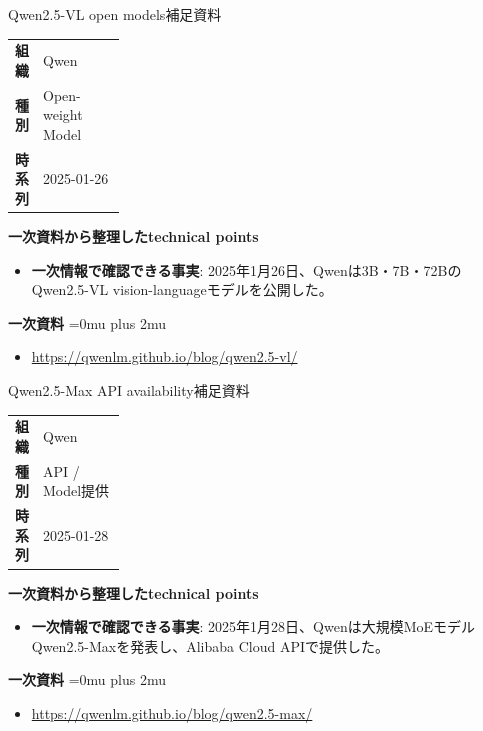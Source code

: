 \begin{technicalnote}{Qwen2.5-VL open models}{補足資料}
\begingroup
\begin{tabularx}{\linewidth}{@{}>{\bfseries}p{0.22\linewidth}X@{}}
組織 & Qwen \\
種別 & Open-weight Model \\
時系列 & 2025-01-26 \\
\end{tabularx}
\smallskip
\begin{minipage}{\linewidth}
{\bfseries 一次資料から整理したtechnical points}
\begin{itemize}[leftmargin=1.5em,itemsep=0.35em]
\item \textbf{一次情報で確認できる事実}: 2025年1月26日、Qwenは3B・7B・72BのQwen2.5-VL vision-languageモデルを公開した。
\end{itemize}
\begin{samepage}
{\bfseries 一次資料}
\begingroup\sloppy
\Urlmuskip=0mu plus 2mu\relax
\begin{itemize}[leftmargin=1.5em,itemsep=0.25em]
\item {\scriptsize\url{https://qwenlm.github.io/blog/qwen2.5-vl/}}
\end{itemize}
\endgroup
\end{samepage}
\end{minipage}
\endgroup
\end{technicalnote}
\medskip

\begin{technicalnote}{Qwen2.5-Max API availability}{補足資料}
\begingroup
\begin{tabularx}{\linewidth}{@{}>{\bfseries}p{0.22\linewidth}X@{}}
組織 & Qwen \\
種別 & API / Model提供 \\
時系列 & 2025-01-28 \\
\end{tabularx}
\smallskip
\begin{minipage}{\linewidth}
{\bfseries 一次資料から整理したtechnical points}
\begin{itemize}[leftmargin=1.5em,itemsep=0.35em]
\item \textbf{一次情報で確認できる事実}: 2025年1月28日、Qwenは大規模MoEモデルQwen2.5-Maxを発表し、Alibaba Cloud APIで提供した。
\end{itemize}
\begin{samepage}
{\bfseries 一次資料}
\begingroup\sloppy
\Urlmuskip=0mu plus 2mu\relax
\begin{itemize}[leftmargin=1.5em,itemsep=0.25em]
\item {\scriptsize\url{https://qwenlm.github.io/blog/qwen2.5-max/}}
\end{itemize}
\endgroup
\end{samepage}
\end{minipage}
\endgroup
\end{technicalnote}
\medskip

